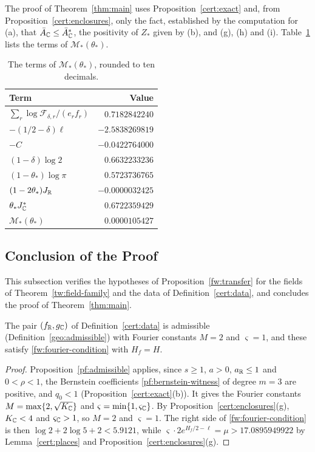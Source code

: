 The proof of Theorem~\ref{thm:main} uses Proposition~\ref{cert:exact} and,
from Proposition~\ref{cert:enclosures}, only the fact, established by the
computation for (a), that $\bar A_\mathbb C\le\bar A_\mathbb C^*$, the positivity of $Z_*$
given by (b), and (g), (h) and (i). Table~\ref{cert:tab-budget} lists the
terms of $\mathcal M_*(\theta_*)$.

\begin{table}[htbp]
\centering\small
\caption{The terms of $\mathcal M_*(\theta_*)$, rounded to ten decimals.}
\label{cert:tab-budget}
\begin{tabular}{lr}
\toprule
Term & Value\\
\midrule
$\sum_r\log\mathcal F_{\delta,r}/(e_rf_r)$ & $0.7182842240$\\
$-(1/2-\delta)\ell$ & $-2.5838269819$\\
$-C$ & $-0.0422764000$\\
$(1-\delta)\log2$ & $0.6632233236$\\
$(1-\theta_*)\log\pi$ & $0.5723736765$\\
$(1-2\theta_*)J_\mathbb R$ & $-0.0000032425$\\
$\theta_*J_\mathbb C^*$ & $0.6722359429$\\
\midrule
$\mathcal M_*(\theta_*)$ & $0.0000105427$\\
\bottomrule
\end{tabular}
\end{table}

\subsection{Conclusion of the Proof}

This subsection verifies the hypotheses of Proposition~\ref{fw:transfer} for
the fields of Theorem~\ref{tw:field-family} and the data of
Definition~\ref{cert:data}, and concludes the proof of
Theorem~\ref{thm:main}.

\begin{corollary}\label{cert:fourier}
The pair $(f_\mathbb R,g_\mathbb C)$ of Definition~\ref{cert:data} is admissible
(Definition~\ref{geo:admissible}) with
Fourier constants $M=2$ and $\varsigma=1$, and these satisfy
\eqref{fw:fourier-condition} with $H_f=H$.
\end{corollary}

\begin{proof}
Proposition~\ref{pf:admissible} applies, since $s\ge1$, $a>0$,
$a_\mathbb R\le1$ and $0<\rho<1$, the Bernstein coefficients
\eqref{pf:bernstein-witness} of degree $m=3$ are positive, and $q_0<1$
(Proposition~\ref{cert:exact}(b)). It gives the Fourier constants
$M=\max\{2,\sqrt{K_\mathbb C}\}$ and $\varsigma=\min\{1,\varsigma_\mathbb C\}$. By
Proposition~\ref{cert:enclosures}(g), $K_\mathbb C<4$ and $\varsigma_\mathbb C>1$, so
$M=2$ and $\varsigma=1$. The right side of \eqref{fw:fourier-condition} is
then $\log2+2\log5+2<5.9121$, while
$\varsigma\cdot2e^{H_f/2-\ell}=\mu>17.0895949922$ by Lemma~\ref{cert:places}
and Proposition~\ref{cert:enclosures}(g).
\end{proof}

